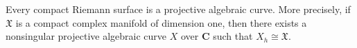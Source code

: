 Every compact Riemann surface is a projective algebraic curve. More precisely, if $\mathfrak{X}$ is a compact complex manifold of dimension one, then there exists a nonsingular projective algebraic curve $X$ over $\mathbf{C}$ such that $X_h \cong \mathfrak{X}$.
